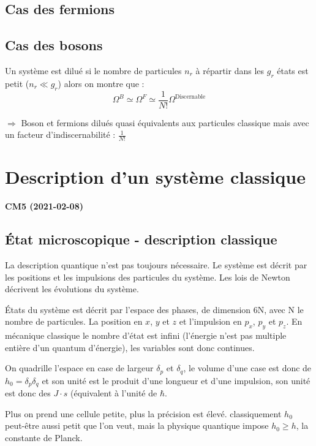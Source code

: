 \documentclass[12pt,a4paper]{report}
\begin{document}
\subsection{Cas des fermions}

\subsection{Cas des bosons}

Un système est dilué si le nombre de particules $n_r$ à répartir dans les $g_r$ états est petit ($n_r \ll g_r$) alors on montre que :
\[
	\Omega^B \simeq \Omega^F \simeq \dfrac{1}{N!}\Omega^{\text{Discernable}}
\]

$\Rightarrow$ Boson et fermions dilués quasi équivalents aux particules classique mais avec un facteur d'indiscernabilité : $\frac{1}{N!}$

\section{Description d'un système classique}

\begin{center}
\textbf{CM5 (2021-02-08)}
\end{center}

\subsection{État microscopique - description classique}

La description quantique n'est pas toujours nécessaire. Le système est décrit par les positions et les impulsions des particules du système. Les lois de Newton décrivent les évolutions du système.

États du système est décrit par l'espace des phases, de dimension 6N, avec N le nombre de particules. La position en \(x\), \(y\) et \(z\) et l'impulsion en $p_x$, $p_y$ et $p_z$.
En mécanique classique le nombre d'état est infini (l'énergie n'est pas multiple entière d'un quantum d'énergie), les variables sont donc continues.

On quadrille l'espace en case de largeur $\delta_p$ et $\delta_q$, le volume d'une case est donc de \(h_0 = \delta_p \delta_q\) et son unité est le produit d'une longueur et d'une impulsion, son unité est donc des $J\cdot s$ (équivalent à l'unité de \(\hbar\).

Plus on prend une cellule petite, plus la précision est élevé. classiquement \(h_0\) peut-être aussi petit que l'on veut, mais la physique quantique impose \(h_0 \geq h\), la constante de Planck.
\end{document}
